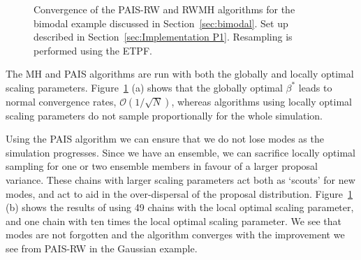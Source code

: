 \documentclass[final]{siamltex}
\begin{document}
\begin{figure}[htb]
\centering
{}
\caption{Convergence of the PAIS-RW and RWMH algorithms for the
bimodal example discussed in Section~\ref{sec:bimodal}. Set up
described in Section~\ref{sec:Implementation P1}. Resampling is
performed using the ETPF.}
\label{fig:BM2_L2}
\end{figure}

The MH and PAIS algorithms are run with both the globally and locally
optimal scaling parameters. Figure~\ref{fig:BM2_L2} (a) shows that the
globally optimal $\beta^*$ leads to normal convergence rates,
$\mathcal{O}(1/\sqrt{N})$, whereas algorithms using locally optimal
scaling parameters do not sample
proportionally for the whole simulation.

Using the PAIS algorithm we can ensure that we do not lose modes as the
simulation progresses. Since we have an ensemble, we can sacrifice
locally optimal sampling for one or two ensemble members in favour of
a larger proposal variance. These chains with larger scaling
parameters act both as `scouts' for new modes, and act to aid in the
over-dispersal of the proposal distribution. Figure~\ref{fig:BM2_L2}
(b) shows the results of using 49 chains with the local optimal
scaling parameter, and one chain with ten times the local optimal
scaling parameter. We see that modes are not forgotten and the
algorithm converges with the improvement we see from PAIS-RW in the
Gaussian example.
\end{document}
